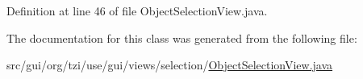 Definition at line 46 of file Object\-Selection\-View.\-java.



The documentation for this class was generated from the following file\-:\begin{DoxyCompactItemize}
\item 
src/gui/org/tzi/use/gui/views/selection/\hyperlink{_object_selection_view_8java}{Object\-Selection\-View.\-java}\end{DoxyCompactItemize}
